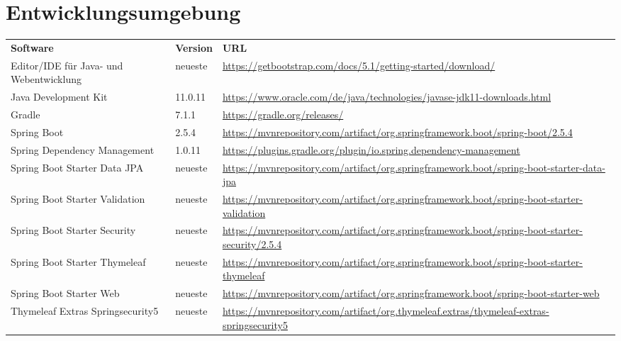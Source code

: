 \newpage
\section{Entwicklungsumgebung}\label{sec:entwicklungsumgebung}

\begin{table}[h]
	\centering
	\begin{tabularx}{\textwidth}{l l X}
		\rowcolor[HTML]{C0C0C0} 
		\textbf{Software} & \textbf{Version} & \textbf{URL} \\
        \rowcolor[HTML]{E7E7E7} 
		    Editor/IDE für Java- und Webentwicklung & neueste & \url{https://getbootstrap.com/docs/5.1/getting-started/download/} \\
		Java Development Kit & 11.0.11 & \url{https://www.oracle.com/de/java/technologies/javase-jdk11-downloads.html} \\
		\rowcolor[HTML]{E7E7E7} 
		Gradle & 7.1.1 & \url{https://gradle.org/releases/} \\
		Spring Boot & 2.5.4 & \url{https://mvnrepository.com/artifact/org.springframework.boot/spring-boot/2.5.4} \\
		\rowcolor[HTML]{E7E7E7} 
			Spring Dependency Management & 1.0.11 & \url{https://plugins.gradle.org/plugin/io.spring.dependency-management} \\
        \rowcolor[HTML]{E7E7E7} 
            Spring Boot Starter Data JPA & neueste & \url{https://mvnrepository.com/artifact/org.springframework.boot/spring-boot-starter-data-jpa} \\
        \rowcolor[HTML]{E7E7E7} 
            Spring Boot Starter Validation & neueste & \url{https://mvnrepository.com/artifact/org.springframework.boot/spring-boot-starter-validation} \\
        \rowcolor[HTML]{E7E7E7} 
            Spring Boot Starter Security & neueste & \url{https://mvnrepository.com/artifact/org.springframework.boot/spring-boot-starter-security/2.5.4} \\
        \rowcolor[HTML]{E7E7E7} 
            Spring Boot Starter Thymeleaf & neueste & \url{https://mvnrepository.com/artifact/org.springframework.boot/spring-boot-starter-thymeleaf} \\
        \rowcolor[HTML]{E7E7E7} 
            Spring Boot Starter Web & neueste & \url{https://mvnrepository.com/artifact/org.springframework.boot/spring-boot-starter-web} \\
        \rowcolor[HTML]{E7E7E7} 
            Thymeleaf Extras Springsecurity5 & neueste & \url{https://mvnrepository.com/artifact/org.thymeleaf.extras/thymeleaf-extras-springsecurity5} \\

\end{tabularx}
\end{table}
